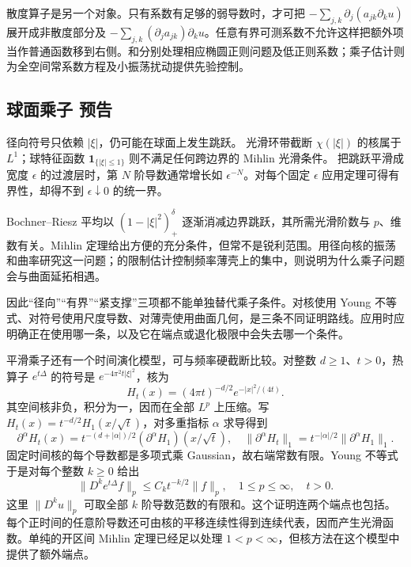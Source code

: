 \ProseParagraphBreak

散度算子是另一个对象。只有系数有足够的弱导数时，才可把
\(-\sum_{j,k}\partial_j(a_{jk}\partial_ku)\) 展开成非散度部分及
\(-\sum_{j,k}(\partial_ja_{jk})\partial_ku\)。任意有界可测系数不允许这样把额外项当作普通函数移到右侧。和分别处理相应椭圆正则问题及低正则系数；乘子估计则为全空间常系数方程及小振荡扰动提供先验控制。

\subsection{球面乘子 预告}
\label{b2:subsec:220304}

径向符号只依赖 \(|\xi|\)，仍可能在球面上发生跳跃。
光滑环带截断 \(\chi(|\xi|)\) 的核属于 \(L^1\)；球特征函数 \(\mathbf1_{\{|\xi|\le1\}}\) 则不满足任何跨边界的 Mihlin 光滑条件。
把跳跃平滑成宽度 \(\epsilon\) 的过渡层时，第 \(N\) 阶导数通常增长如 \(\epsilon^{-N}\)。对每个固定 \(\epsilon\) 应用定理可得有界性，却得不到 \(\epsilon\downarrow0\) 的统一界。

\ProseParagraphBreak
Bochner–Riesz 平均以 \((1-|\xi|^2)_+^\delta\) 逐渐消减边界跳跃，其所需光滑阶数与 \(p\)、维数有关。Mihlin 定理给出方便的充分条件，但常不是锐利范围。用径向核的振荡和曲率研究这一问题；的限制估计控制频率薄壳上的集中，则说明为什么乘子问题会与曲面延拓相遇。

\ProseParagraphBreak
因此“径向”“有界”“紧支撑”三项都不能单独替代乘子条件。对核使用 Young 不等式、对符号使用尺度导数、对薄壳使用曲面几何，是三条不同证明路线。应用时应明确正在使用哪一条，以及它在端点或退化极限中会失去哪一个条件。

平滑乘子还有一个时间演化模型，可与频率硬截断比较。对整数 \(d\geq1\)、\(t>0\)，热算子 \(e^{t\Delta}\) 的符号是 \(e^{-4\pi^2t|\xi|^2}\)，核为
\[
 H_t(x)=(4\pi t)^{-d/2}e^{-|x|^2/(4t)}.
\]
其空间核非负，积分为一，因而在全部 \(L^p\) 上压缩。写
\(H_t(x)=t^{-d/2}H_1(x/\sqrt t)\)，对多重指标 \(\alpha\) 求导得到
\[
 \partial^\alpha H_t(x)
 =t^{-(d+|\alpha|)/2}
       (\partial^\alpha H_1)(x/\sqrt t),\quad
 \|\partial^\alpha H_t\|_1
 =t^{-|\alpha|/2}\|\partial^\alpha H_1\|_1.
\]
固定时间核的每个导数都是多项式乘 Gaussian，故右端常数有限。Young 不等式于是对每个整数 \(k\geq0\) 给出
\[
 \|D^ke^{t\Delta}f\|_p\leq C_k t^{-k/2}\|f\|_p,
 \quad 1\leq p\leq\infty,\quad t>0.
\]
这里 \(\|D^k u\|_p\) 可取全部 \(k\) 阶导数范数的有限和。这个证明连两个端点也包括。每个正时间的任意阶导数还可由核的平移连续性得到连续代表，因而产生光滑函数。单纯的开区间 Mihlin 定理已经足以处理 \(1<p<\infty\)，但核方法在这个模型中提供了额外端点。

